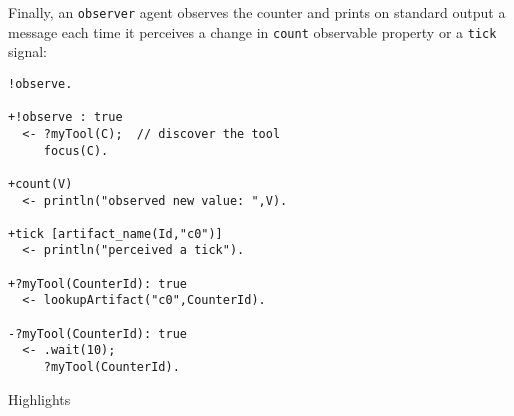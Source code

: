 \documentclass[11pt]{report}
\newcommand\code[1]{{\small{\mbox{\texttt{{#1}}}}}}
\begin{document}
\noindent Finally, an \code{observer} agent observes the counter and prints on standard output a message each time it perceives a change in \code{count} observable property or  a \code{tick} signal:
%
{\small{
\begin{verbatim}
!observe.

+!observe : true 
  <- ?myTool(C);  // discover the tool
     focus(C).

+count(V) 
  <- println("observed new value: ",V).

+tick [artifact_name(Id,"c0")]  
  <- println("perceived a tick").

+?myTool(CounterId): true 
  <- lookupArtifact("c0",CounterId).

-?myTool(CounterId): true 
  <- .wait(10); 
     ?myTool(CounterId).
\end{verbatim}}}
%
\noindent Highlights
\end{document}
